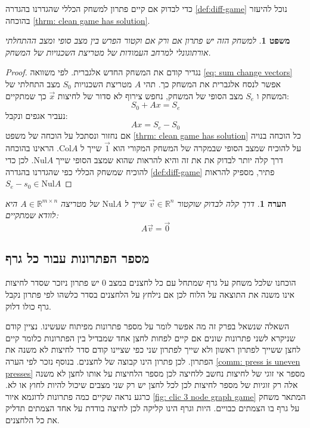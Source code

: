\documentclass[12pt,leqno]{article}
\theoremstyle{theoremdd}
\newtheorem{theorem}{משפט}
\newtheorem{comm}{הערה}
\newcommand{\Col}{\mathrm{Col}}
\newcommand{\Nul}{\mathrm{Nul}}
\begin{document}
כדי לבדוק אם קיים פתרון למשחק הכללי שהגדרנו 
בהגדרה 
\ref{def:diff-game}
נוכל להיעזר בהוכחה
\ref{thrm: clean game has solution}.
\begin{theorem}
    למשחק הזה יש פתרון אם ורק אם וקטור הפרש בין מצב סופי ומצב ההתחלתי אורתוגונלי למרחב 
    העמודות של מטריצת השכנויות של המשחק.
\end{theorem}
\begin{proof}
    נגדיר קודם את המשחק החדש אלגברית.
    לפי משוואה 
    \ref{eq: sum change vectors}
    אפשר לנסח אלגברית את המשחק כך.
    תהי 
    $A$
    מטריצת השכנויות 
    $S_0$
    מצב התחלתי של המשחק 
    ו
    $S_e$
    מצב הסופי של המשחק,
    נחפש צירוף 
    לא סדור של לחיצות 
    $\vec x$
    כך שמתקיים:
    \[
        S_0 + Ax = S_e
    \]
    נעביר אגפים ונקבל:
    \[
         Ax = S_e - S_0
    \]
    אם נחזור ונסתכל על הוכחה
    של משפט 
    \ref{thrm: clean game has solution}
    כל הוכחה בנויה על להוכיח שמצב הסופי 
    שבמקרה של המשחק המקורי הוא 
    $\vec 1$
    שייך ל
    $\Col A$.
    הראינו בהוכחה דרך 
    קלה יותר לבדוק את את זה והיא
    להראות שהוא שמצב
    הסופי 
    שייך 
    $\Nul A$.
    לכן כדי להוכיח שמשחק הכללי כפי שהגדרנו 
    בהגדרה 
    \ref{def:diff-game}
    פתיר, 
    מספיק להראות 
    $S_e - s_0 \in \Nul A$
\end{proof}
\begin{comm}
    דרך קלה לבדוק שוקטור 
    $\vec v \in \mathbb{R}^{n}$
    שייך 
    ל
    $\Nul A$
    של מטריצה 
    $A \in \mathbb{R}^{m \times n}$
    היא לוודא שמתקיים:
    \[ A \vec v = \vec 0\]
\end{comm}
\subsection{מספר הפתרונות עבור כל גרף}
הוכחנו שלכל משחק על גרף שמתחל עם כל לחצנים במצב 
$0$
יש פתרון ניזכר שסדר לחיצות
אינו משנה את התוצאה על הלוח לכן אם נילחץ על הלחצנים בסדר כלשהו 
לפי פתרון נקבל גרף כולו דלוק.

השאלה  שנשאל בפרק זה מה אפשר לומר על מספר פתרונות מפיתוח שעשינו.
נציין קודם שניקרא לשני פתרונות שונים אם קיים לפחות לחצן אחד שמבדיל בין הפתרונות 
כלומר קיים לחצן ששייך לפתרון ראשון ולא שייך לפתרון שני כפי שציינו קודם סדר
לחיצות לא משנה את הפתרון.
לכן פתרון הינו קבוצה של לחצנים.
בנוסף נזכר לפי הערה
\ref{comm: press is uneven presses}
מספר אי זוגי של לחיצות נחשב ללחיצה לכן מספר הלחיצות על אותו לחצן לא משנה 
אלה רק זוגיות של מספר לחיצות 
לכן לכל לחצן יש רק שני מצבים שיכול להיות 
לחוץ 
או לא.
כרגע נראה שקיים כמה פתרונות לדוגמא 
איור
\ref{fig: clic 3 node graph game}
המתאר משחק על גרף בו הצמתים כבויים.
היות וגרף הינו קליקה לכן לחיצה בודדת על אחד הצמתים תדליק את כל הלחצנים.
\end{document}
